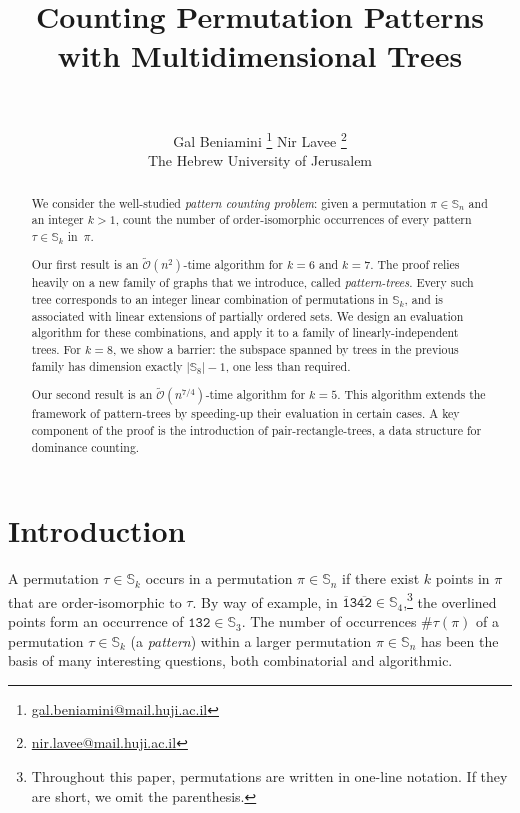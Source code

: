 \documentclass{article}
\title{Counting Permutation Patterns with Multidimensional Trees}
\author{
\vphantom{A}\vspace{0.1cm}
\\\small \vphantom{B}
}
\author{
Gal Beniamini \thanks{\href{mailto:gal.beniamini@mail.huji.ac.il}{gal.beniamini@mail.huji.ac.il}} \quad Nir Lavee \thanks{\href{mailto:nir.lavee@mail.huji.ac.il}{nir.lavee@mail.huji.ac.il}}
\\ \small The Hebrew University of Jerusalem
}
\date{}
\newcommand{\Sn}{\mathbb{S}_n}
\newcommand{\pc}[2]{{\# \mathtt{ #1 } \left( #2 \right)}}
\theoremstyle{remark}
\newcommand{\Otilde}[1]{\widetilde{\mathcal{O}}\left( #1 \right)}
\theoremstyle{plain}
\begin{document}
\maketitle


\vspace{-1cm}

\begin{abstract}

We consider the well-studied \textit{pattern counting problem}: given a permutation $\pi \in \Sn$
and an integer $k > 1$, count the number of order-isomorphic occurrences
of every pattern $\tau \in \mathbb{S}_k$ in~$\pi$.

Our first result is an $\Otilde{n^2}$-time algorithm for $k=6$ and $k=7$.
The proof relies heavily on a new family of graphs that we introduce, called \textit{pattern-trees}.
Every such tree corresponds to an integer linear combination
of permutations in $\mathbb{S}_k$,
and is associated with linear extensions of partially ordered sets.
We design an evaluation algorithm for these combinations, and apply
it to a family of linearly-independent trees.
For $k=8$, we show a barrier:
the subspace spanned by trees in the previous family
has dimension exactly $|\mathbb{S}_8| - 1$, one less than required.

Our second result is an $\widetilde{\mathcal{O}}(n^{7/4})$-time algorithm for $k=5$. 
This algorithm extends the framework of pattern-trees by speeding-up their evaluation
in certain cases. A key component of the proof is the introduction 
of pair-rectangle-trees, a data structure for dominance counting.
\end{abstract}

\section{Introduction}
\label{sect:introduction}

A permutation $\tau \in \mathbb{S}_k$ occurs in a permutation $\pi \in \mathbb{S}_n$
if there exist $k$ points in $\pi$ that are order-isomorphic to $\tau$.
By way of example, in $\mathtt{\overline{1}3\overline{42}} \in \mathbb{S}_4$,\footnote{
Throughout this paper, permutations are written in one-line notation. If they are short, we omit the parenthesis.
}
the overlined points form an occurrence of $\mathtt{132} \in \mathbb{S}_3$.
The number of occurrences $\pc{\tau}{\pi}$ of a permutation 
$\tau \in \mathbb{S}_k$ (a \textit{pattern}) within a larger permutation $\pi \in \Sn$
has been the basis of many interesting questions, both combinatorial and algorithmic.
\end{document}
